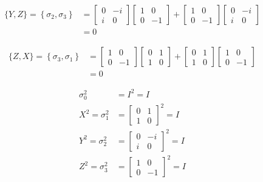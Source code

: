 \begin{align*}
\{Y, Z\}=\left\{\sigma_2, \sigma_3 \right\} &= \begin{bmatrix}
0 & -i \\
i & 0
\end{bmatrix}
\begin{bmatrix}
1 & 0 \\
0 & -1
\end{bmatrix}
+
\begin{bmatrix}
1 & 0 \\
0 & -1
\end{bmatrix}
\begin{bmatrix}
0 & -i \\
i & 0
\end{bmatrix}\\
&=0
\end{align*}

\begin{align*}
\{Z, X\} = \left\{\sigma_3, \sigma_1 \right\} &= \begin{bmatrix}
1 & 0 \\
0 & -1
\end{bmatrix}
\begin{bmatrix}
0 & 1 \\
1 & 0
\end{bmatrix}
+
\begin{bmatrix}
0 & 1 \\
1 & 0
\end{bmatrix}
\begin{bmatrix}
1 & 0 \\
0 & -1
\end{bmatrix}\\
&=0
\end{align*}

\begin{align*}
	\sigma_0^2 &= I^2 = I\\
%
	X^2=\sigma_1^2 &= \begin{bmatrix}
	0 & 1 \\
	1 & 0
	\end{bmatrix} ^2 = I\\
%
	Y^2=\sigma_2^2 &= \begin{bmatrix}
	0 & -i \\
	i & 0
	\end{bmatrix} ^2 = I\\
%
	Z^2=\sigma_3^2 &= \begin{bmatrix}
	1 & 0 \\
	0 & -1
	\end{bmatrix} ^2 = I
\end{align*}

